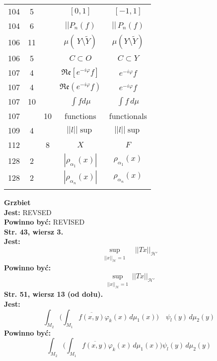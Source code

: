 \documentclass[a4paper,11pt]{article}
\newcommand{\ol}{\overline}
\newcommand{\wt}{\widetilde}
\newcommand{\mc}{\mathcal}
\newcommand{\mf}{\mathfrak}
\newcommand{\al}{\alpha}
\newcommand{\vp}{\varphi}
\newcommand{\Hc}{\mc{H}}
\newcommand{\subs}{\subset}
\newcommand{\setm}{\setminus}
\newcommand{\Real}{\mf{Re}}
\newcommand{\Int}{\int\limits}
\newcommand{\IntCaD}[2] { \Int #1 \, d#2 } %
\newcommand{\norm}[1]{\left|\left| #1 \right|\right|}
\newcommand{\tb}{\textbf}
\newcommand{\noi}{\noindent}
\newcommand{\StrWg}[2]{\tb{Str. #1, wiersz #2.}}
\newcommand{\StrWd}[2]{\tb{Str. #1, wiersz #2 (od dołu).}}
\newcommand{\Jest}{\tb{Jest: }}
\newcommand{\Pow}{\tb{Powinno być: }}
\begin{document}
\begin{center}
\begin{tabular}{|c|c|c|c|c|}
    104 & 5 & & $[ 0, 1 ]$ & $[ -1, 1 ]$ \\
    104 & 6 & & $||P_{ n }( f )$ & $|| \, P_{ n }( f )$ \\
    106 & 11 & & $\mu( \, Y \setm \wt{ Y } )$
           & $\mu( Y \setm \wt{ Y } )$ \\
    106 & 5 & & $C \subs O$ & $C \subs Y$ \\
    107 & 4 & & $\Real[ e^{ -i \vp } f ]$ & $e^{ -i \vp } f$ \\
    107 & 4 & & $\Real( e^{ -i \vp } f )$ & $e^{ -i \vp } f$ \\
    107 & 10 & & $\int\! fd\mu$ & $\IntCaD{ f }{ \mu }$ \\
    107 & & 10 & functions & functionals \\
    109 & 4 & & $\norm{ l }\!\sup$ & $\norm{ l } \sup$ \\
    112 & & 8 & $X$ & $F$ \\
    128 & 2 & & $| \rho_{ \al_{ 1 } }( x ) |$ & $\rho_{ \al_{ 1 } }( x )$ \\
    128 & 2 & & $| \rho_{ \al_{ n } }( x ) |$ & $\rho_{ \al_{ n } }( x )$ \\
    & & & & \\ \hline
  \end{tabular}
\end{center}
\noi
\tb{Grzbiet} \\
\Jest REVSED \\
\Pow REVISED \\
\StrWg{43}{3} \\
\Jest
\begin{equation*}
  \sup_{ \substack{ \norm{ x }_{ \Hc } = 1 } } \;\;\; \norm{ T x }_{ \Hc' }
\end{equation*}
\Pow
\begin{equation*}
  \sup_{ \substack{ \norm{ x }_{ \Hc } = 1 } } \norm{ T x }_{ \Hc' }
\end{equation*}
\StrWd{51}{13} \\
\Jest
\begin{equation*}
  \int_{ M_{ 2 } } \bigg( \int_{ M_{ 1 } } \ol{ f( x, y ) } \vp_{ k }( x ) \,
  d\mu_{ 1 }( x ) \bigg) \quad \psi_{ l }( y ) \, d\mu_{ 2 }( y )
\end{equation*}
\Pow
\begin{equation*}
  \int_{ M_{ 2 } } \bigg( \int_{ M_{ 1 } } \ol{ f( x, y ) } \vp_{ k }( x ) \,
  d\mu_{ 1 }( x ) \bigg) \psi_{ l }( y ) \, d\mu_{ 2 }( y )
\end{equation*}



 {}
\end{document}
